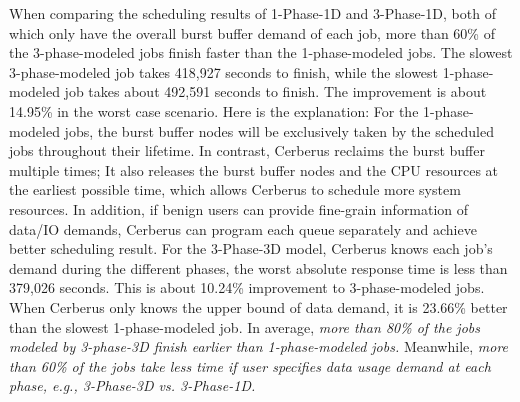 When comparing the scheduling results of 1-Phase-1D and 3-Phase-1D,
both of which only have the overall burst buffer demand of each job,
more than 60\% of the 3-phase-modeled jobs finish faster than the 1-phase-modeled jobs.
The slowest 3-phase-modeled job takes 418,927 seconds to finish,
while the slowest 1-phase-modeled job takes about 492,591 seconds to finish.
The improvement is about 14.95\% in the worst case scenario.
Here is the explanation: For the 1-phase-modeled jobs, the burst buffer nodes will be exclusively
taken by the scheduled jobs throughout their lifetime. In contrast, Cerberus reclaims the burst buffer multiple times;
It also releases the burst buffer nodes and the CPU resources at the earliest possible time, which allows Cerberus to schedule more system resources.
In addition, if benign users can provide fine-grain information of data/IO demands,
Cerberus can program each queue separately and achieve better scheduling result.
For the 3-Phase-3D model, Cerberus knows each job's demand during the different phases,
the worst absolute response time is less than 379,026 seconds.
This is about 10.24\% improvement to 3-phase-modeled jobs.
When Cerberus only knows the upper bound of data demand,
it is 23.66\% better than the slowest 1-phase-modeled job.
In average, \textit{more than 80\% of the jobs
modeled by 3-phase-3D finish earlier than 1-phase-modeled jobs.}
Meanwhile, \textit{more than 60\% of the jobs take less time if user
specifies data usage demand at each phase, e.g., 3-Phase-3D vs. 3-Phase-1D.}





